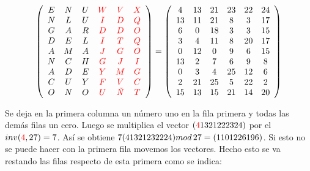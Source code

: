 \documentclass{article}
\begin{document}
\begin{equation*}
    \left( \begin{array}{cccccc}
    E & N & U & \textcolor{red}{W} & \textcolor{red}{V} & \textcolor{red}{X} \\
    N & L & U & \textcolor{red}{I} & \textcolor{red}{D} & \textcolor{red}{Q} \\
    G & A & R & \textcolor{red}{D} & \textcolor{red}{D} & \textcolor{red}{O} \\
    D & E & L & \textcolor{red}{I} & \textcolor{red}{T} & \textcolor{red}{Q} \\
    A & M & A & \textcolor{red}{J} & \textcolor{red}{G} & \textcolor{red}{O} \\
    N & C & H & \textcolor{red}{G} & \textcolor{red}{J} & \textcolor{red}{I} \\
    A & D & E & \textcolor{red}{Y} & \textcolor{red}{M} & \textcolor{red}{G} \\
    C & U & Y & \textcolor{red}{F} & \textcolor{red}{V} & \textcolor{red}{C} \\
    O & N & O & \textcolor{red}{U} & \textcolor{red}{\text{\textit{Ñ}}} & \textcolor{red}{T} 
    \end{array} \right) = \left(     \begin{array}{cccccc}
    4 & 13 & 21 & 23 & 22 & 24 \\
    13 & 11 & 21 & 8 & 3 & 17 \\
    6 & 0 & 18 & 3 & 3 & 15 \\
    3 & 4 & 11 & 8 & 20 & 17 \\
    0 & 12 & 0 & 9 & 6 & 15 \\
    13 & 2 & 7 & 6 & 9 & 8 \\
    0 & 3 & 4 & 25 & 12 & 6 \\
    2 & 21 & 25 & 5 & 22 & 2 \\
    15 & 13 & 15 & 21 & 14 & 20 \\
    \end{array} \right) 
\end{equation*}
\justify

Se deja en la primera columna un número uno en la fila primera y todas las demás filas un cero. Luego se multiplica el vector $(\textcolor{red}{4} 13 21 22 23 24)$ por el $inv (\textcolor{red}{4},27)=7$. Así se obtiene $7 (4 13 21 23 22 24) mod \thinspace 27 = (1 10 12 26 19 6)$. Si esto no se puede hacer con la primera fila movemos los vectores. Hecho esto se va restando las filas respecto de esta primera como se indica:
\end{document}

